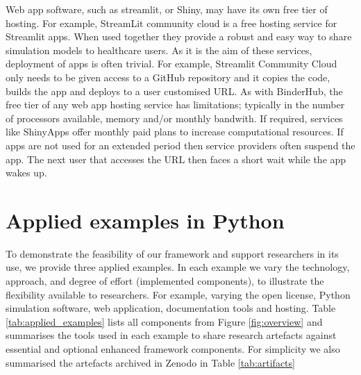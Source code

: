 \documentclass[]{interact}
\theoremstyle{plain}%
\theoremstyle{definition}
\theoremstyle{remark}
\begin{document}
Web app software, such as streamlit, or Shiny, may have its own free tier of hosting.  For example, StreamLit community cloud is a free hosting service for Streamlit apps. When used together they provide a robust and easy way to share simulation models to healthcare users. As it is the aim of these services, deployment of apps is often trivial. For example, Streamlit Community Cloud only needs to be given access to a GitHub repository and it copies the code, builds the app and deploys to a user customised URL. As with BinderHub, the free tier of any web app hosting service has limitations; typically in the number of processors available, memory and/or monthly bandwith.  If required, services like ShinyApps offer monthly paid plans to increase computational resources.  If apps are not used for an extended period then service providers often suspend the app.  The next user that accesses the URL then faces a short wait while the app wakes up.

\section{Applied examples in Python}

To demonstrate the feasibility of our framework and support researchers in its use, we provide three applied examples. In each example we vary the technology, approach, and degree of effort (implemented components), to illustrate the flexibility available to researchers. For example, varying the open license, Python simulation software, web application, documentation tools and hosting.  Table \ref{tab:applied_examples} lists all components from Figure \ref{fig:overview} and summarises the tools used in each example to share research artefacts against essential and optional enhanced framework components.  For simplicity we also summarised the artefacts archived in Zenodo in Table \ref{tab:artifacts}
\end{document}
